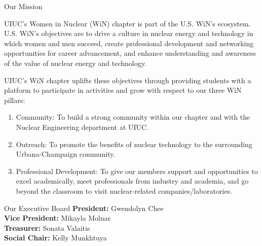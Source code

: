 \documentclass{resume2} %
\begin{document}
\begin{rSection}{Our Mission}
\raggedright
UIUC's Women in Nuclear (WiN) chapter is part of the 
U.S. WiN's ecosystem. U.S. WiN's objectives are to 
drive a culture in nuclear energy and technology 
in which women and men succeed, create professional development 
and networking opportunities for career advancement, and enhance understanding 
and awareness of the value of nuclear energy and technology.

UIUC's WiN chapter uplifts these objectives through 
providing students with a platform to participate 
in activities and grow with respect to our three WiN 
pillars: 

\begin{enumerate}
	\item Community: To build a strong community within our chapter and 
	with the Nuclear Engineering department at UIUC. 
	\item Outreach: To promote the benefits of nuclear technology to the surrounding 
	Urbana-Champaign community. 
	\item Professional Development: To give our members support and opportunities to excel 
	academically, meet professionals from industry and academia, and go beyond the classroom 
	to visit nuclear-related companies/laboratories. 
\end{enumerate}

\end{rSection}

\begin{rSection}{Our Executive Board}
	\textbf{President:} Gwendolyn Chee  \\
	\textbf{Vice President:} Mikayla Molnar \\
	\textbf{Treasurer:} Sonata Valaitis \\
	\textbf{Social Chair:} Kelly Munkhtuya 
\end{rSection}
\end{document}
